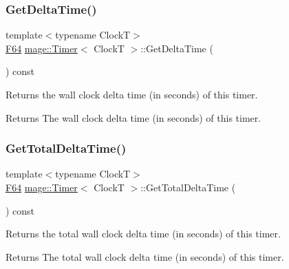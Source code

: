 \subsubsection{\texorpdfstring{Get\+Delta\+Time()}{GetDeltaTime()}}
{\footnotesize\ttfamily template$<$typename ClockT$>$ \\
\hyperlink{namespacemage_ad26233bbec640deda836e572c1a23708}{F64} \hyperlink{classmage_1_1_timer}{mage\+::\+Timer}$<$ ClockT $>$\+::Get\+Delta\+Time (\begin{DoxyParamCaption}{ }\end{DoxyParamCaption}) const\hspace{0.3cm}{\ttfamily [noexcept]}}

Returns the wall clock delta time (in seconds) of this timer.

\begin{DoxyReturn}{Returns}
The wall clock delta time (in seconds) of this timer. 
\end{DoxyReturn}
\hypertarget{classmage_1_1_timer_a4d67e33d559196d2d1ca1f75f12d5644}{}\label{classmage_1_1_timer_a4d67e33d559196d2d1ca1f75f12d5644} 
\subsubsection{\texorpdfstring{Get\+Total\+Delta\+Time()}{GetTotalDeltaTime()}}
{\footnotesize\ttfamily template$<$typename ClockT$>$ \\
\hyperlink{namespacemage_ad26233bbec640deda836e572c1a23708}{F64} \hyperlink{classmage_1_1_timer}{mage\+::\+Timer}$<$ ClockT $>$\+::Get\+Total\+Delta\+Time (\begin{DoxyParamCaption}{ }\end{DoxyParamCaption}) const\hspace{0.3cm}{\ttfamily [noexcept]}}

Returns the total wall clock delta time (in seconds) of this timer.

\begin{DoxyReturn}{Returns}
The total wall clock delta time (in seconds) of this timer. 
\end{DoxyReturn}
\hypertarget{classmage_1_1_timer_a2a8aefb272e02d8ba4a26058df80f119}{}\label{classmage_1_1_timer_a2a8aefb272e02d8ba4a26058df80f119} 
